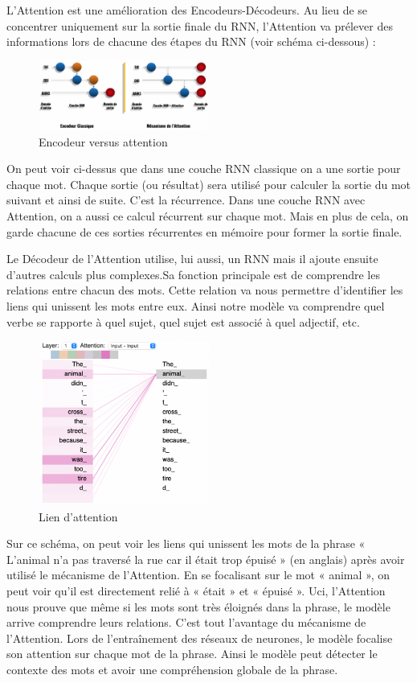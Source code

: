 \documentclass[8pt]{article}
\begin{document}
L'Attention est une amélioration des Encodeurs-Décodeurs. Au lieu de se
concentrer uniquement sur la sortie finale du RNN, l'Attention va
prélever des informations lors de chacune des étapes du RNN (voir schéma
ci-dessous) :
\begin{figure}
\centering
\includegraphics[width=0.5\textwidth]{EncoderVSAttention-1024x417.png}
\caption{Encodeur versus attention}
\end{figure}
On peut voir ci-dessus que dans une couche RNN classique on a une sortie
pour chaque mot. Chaque sortie (ou résultat) sera utilisé pour calculer
la sortie du mot suivant et ainsi de suite. C'est la récurrence. Dans
une couche RNN avec Attention, on a aussi ce calcul récurrent sur chaque
mot. Mais en plus de cela, on garde chacune de ces sorties récurrentes
en mémoire pour former la sortie finale.

Le Décodeur de l'Attention utilise, lui aussi, un RNN mais il ajoute
ensuite d'autres calculs plus complexes.Sa fonction principale est de
comprendre les relations entre chacun des mots. Cette relation va nous
permettre d'identifier les liens qui unissent les mots entre eux. Ainsi
notre modèle va comprendre quel verbe se rapporte à quel sujet, quel
sujet est associé à quel adjectif, etc.

\begin{figure}
\centering
\includegraphics[width=0.5\textwidth]{AttentionViz-768x738.png}
\caption{Lien d'attention}
\end{figure}


Sur ce schéma, on peut voir les liens qui unissent les mots de la phrase
« L'animal n'a pas traversé la rue car il était trop épuisé » (en
anglais) après avoir utilisé le mécanisme de l'Attention. En se
focalisant sur le mot « animal », on peut voir qu'il est directement
relié à « était » et « épuisé ». Uci, l'Attention nous prouve que même
si les mots sont très éloignés dans la phrase, le modèle arrive
comprendre leurs relations. C'est tout l'avantage du mécanisme de
l'Attention. Lors de l'entraînement des réseaux de neurones, le modèle
focalise son attention sur chaque mot de la phrase. Ainsi le modèle peut
détecter le contexte des mots et avoir une compréhension globale de la
phrase.
\end{document}
